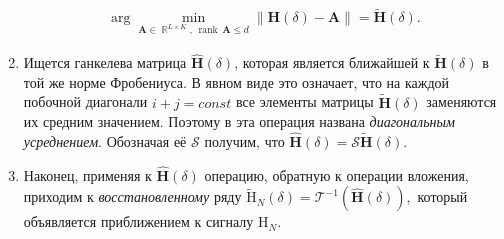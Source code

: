 \documentclass[specialist,
substylefile = spbu_report.rtx,
subf,href,colorlinks=true, 12pt]{disser}
\newcommand\norm[1]{\left\|#1\right\|}
\DeclareMathOperator\R{\mathbb{R}}
\DeclareMathOperator\rank{\textrm{rank}\,}
\begin{document}
\begin{enumerate}
\begin{gather*}
			\arg\min_{\mathbf{A}\in\R^{L\times K},\,\rank \mathbf{A} \leqslant d}\norm{\mathbf{H}(\delta) - \mathbf{A}}=\widetilde{ \mathbf{H}}(\delta).
		\end{gather*}
		\item
		Ищется ганкелева матрица  $\widehat{ \mathbf{H}}(\delta)$, которая является ближайшей к  $\widetilde{ \mathbf{H}}(\delta)$ в той же норме
		Фробениуса.
		В явном виде это означает, что на каждой побочной диагонали $i+j=const$ все элементы матрицы $\widetilde{ \mathbf{H}}(\delta)$ заменяются их
		средним значением. Поэтому
		в \cite{GNZh01} эта операция названа {\it диагональным усреднением}. Обозначая её $\mathcal{S}$ получим, что   $\widehat{\mathbf{H}}(\delta)=\mathcal{S} \widetilde{ \mathbf{H}}(\delta)$.
		\item
		Наконец, применяя к $\widehat{ \mathbf{H}}(\delta)$ операцию, обратную к операции вложения, приходим к {\it восстановленному} ряду $\widetilde{\mathrm{H}}_{N}(\delta)=\mathcal{T}^{-1}(\widehat{\mathbf{H}}(\delta)),$
		который объявляется приближением к сигналу $\mathrm{H}_N$.
	\end{enumerate}
\end{document}
